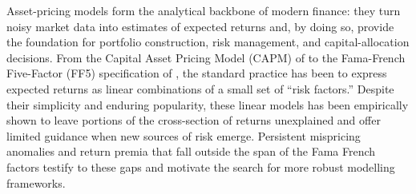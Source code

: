 
Asset-pricing models form the analytical backbone of modern finance: they turn noisy market data into estimates of expected returns and, by doing so, provide the foundation for portfolio construction, risk management, and capital-allocation decisions.  From the Capital Asset Pricing Model (CAPM) of  to the Fama-French Five-Factor (FF5) specification of , the standard practice has been to express expected returns as linear combinations of a small set of “risk factors.”  Despite their simplicity and enduring popularity, these linear models has been empirically shown to leave portions of the cross-section of returns unexplained and offer limited guidance when new sources of risk emerge.  Persistent mispricing anomalies and return premia that fall outside the span of the Fama French factors testify to these gaps and motivate the search for more robust modelling frameworks.


